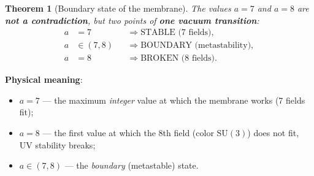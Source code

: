 \documentclass[11pt,a4paper]{article}
\newcommand{\SU}{\ensuremath{\mathrm{SU}}}
\newtheorem{theorem}{Theorem}[section]
\theoremstyle{definition}
\begin{document}
\begin{theorem}[Boundary state of the membrane]
\label{thm:membrane-boundary}
The values $a = 7$ and $a = 8$ are \textbf{not a contradiction},
but two points of \textbf{one vacuum transition}:
\begin{equation}
    \boxed{
    \begin{aligned}
        a &= 7 &&\Rightarrow \text{STABLE (7 fields)}, \\
        a &\in (7, 8) &&\Rightarrow \text{BOUNDARY (metastability)}, \\
        a &= 8 &&\Rightarrow \text{BROKEN (8 fields)}.
    \end{aligned}}
    \label{eq:membrane-boundary-states}
\end{equation}
\end{theorem}

\medskip\noindent
\textbf{Physical meaning}:
\begin{itemize}
    \item $a = 7$ --- the maximum \emph{integer} value
          at which the membrane works (7 fields fit);
    \item $a = 8$ --- the first value at which the 8th field
          (color $\SU(3)$) does not fit, UV stability breaks;
    \item $a \in (7, 8)$ --- the \emph{boundary} (metastable)
          state.
\end{itemize}
\end{document}
